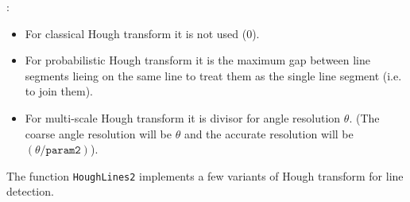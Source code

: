 \begin{description}
\begin{itemize}
\end{itemize}
:
\begin{itemize}
  \item For classical Hough transform it is not used (0).
  \item For probabilistic Hough transform it is the maximum gap between line segments lieing on the same line to treat them as the single line segment (i.e. to join them).
  \item For multi-scale Hough transform it is divisor for angle resolution $\theta$. (The coarse angle resolution will be $\theta$ and the accurate resolution will be $(\theta / \texttt{param2})$).
\end{itemize}
\end{description}

The function \texttt{HoughLines2} implements a few variants of Hough transform for line detection.

